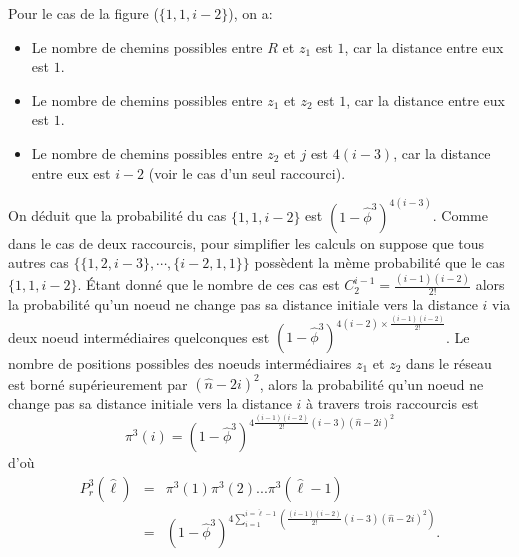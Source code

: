 \begin{itemize}
Pour le cas de la figure ($\{1,1,i-2\}$), on a:
\begin{itemize}
	\item Le nombre de chemins possibles entre $R$ et $z_1$ est $1$, car la distance entre eux est $1$.
	\item Le nombre de chemins possibles entre $z_1$ et $z_2$ est $1$, car la distance entre eux est $1$.
	\item Le nombre de chemins possibles entre $z_2$ et $j$ est $4(i-3)$, car la distance entre eux est $i-2$ (voir le cas d'un seul raccourci).  
\end{itemize}
On déduit que la probabilité du cas $\{1,1,i-2\}$ est $(1-\hat{\phi}^3)^{4(i-3)}$.
Comme dans le cas de deux raccourcis, pour simplifier les calculs on suppose que tous autres cas $\{\{1,2,i-3\},\cdots,\{i-2,1,1\}\}$ possèdent la mème probabilité que le cas $\{1,1,i-2\}$. Étant donné que le nombre de ces cas est $C_2^{i-1}=\frac{(i-1)(i-2)}{2!}$ alors la probabilité qu'un noeud ne change pas sa distance initiale vers la distance  $i$ via deux noeud intermédiaires quelconques est $(1-\hat{\phi}^3)^{4(i-2)\times\frac{(i-1)(i-2)}{2!}}$.
Le nombre de positions possibles des noeuds intermédiaires $z_1$ et $z_2$ dans le réseau est borné supérieurement par  $(\hat{n}-2i)^2$, alors la probabilité qu'un noeud ne change pas sa distance initiale vers la distance  $i$ à travers trois raccourcis est
	\begin{equation}
	\pi^3(i)=(1-\hat{\phi}^3)^{4\frac{(i-1)(i-2)}{2!}(i-3)(\hat{n}-2i)^2}
	\end{equation}
	  d'où
	\begin{eqnarray}
	P_r^3(\hat{\ell})&=&\pi^3(1)\pi^3(2)...\pi^3(\hat{\ell}-1)\\\nonumber
	&=& (1-\hat{\phi}^3)^{4\sum_{i=1}^{i=\hat{\ell}-1}(\frac{(i-1)(i-2)}{2!}(i-3)(\hat{n}-2i)^2)}.
	\end{eqnarray}
	

\end{itemize}
